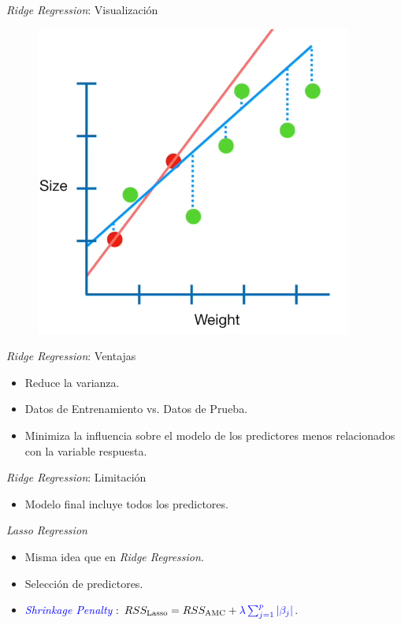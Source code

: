 \documentclass[11pt]{beamer}
\begin{document}
\begin{frame}{\textit{Ridge Regression}: Visualización}
	\begin{figure}
		\includegraphics[scale=0.4]{figures/ridge.png}
	\end{figure}
\end{frame}


\begin{frame}{\textit{Ridge Regression}: Ventajas}
	\begin{itemize}
		\item Reduce la varianza.
		\item Datos de Entrenamiento vs. Datos de Prueba.
		\item Minimiza la influencia sobre el modelo de los predictores menos relacionados con la variable respuesta.
	\end{itemize}
\end{frame}

\begin{frame}{\textit{Ridge Regression}: Limitación}
	\begin{itemize}
		\item Modelo final incluye todos los predictores.
	\end{itemize}
\end{frame}

\begin{frame}{\textit{Lasso Regression}}
	\begin{itemize}
		\item Misma idea que en \textit{Ridge Regression}.
		\item Selección de predictores.
		\item \textcolor{blue}{\textit{Shrinkage Penalty}} : $RSS_{\text{Lasso}} = RSS_{\text{AMC}} + \textcolor{blue}{\lambda \sum^p_{j=1} |\beta_j|}$.
	\end{itemize}
\end{frame}
\end{document}
